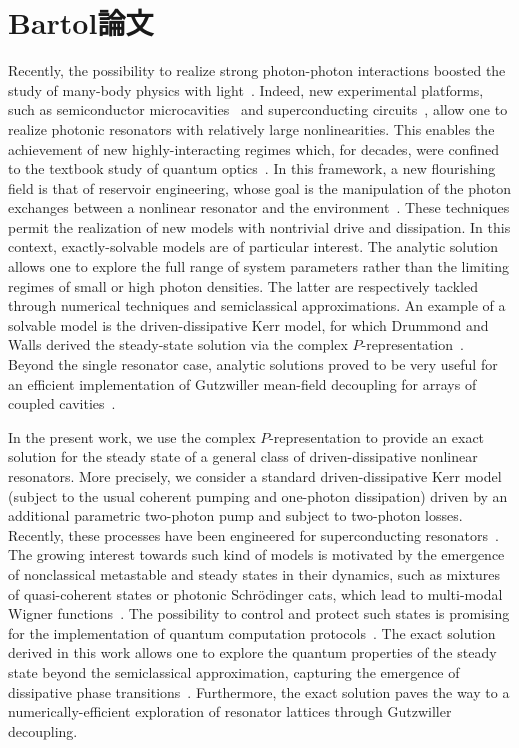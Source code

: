 \section{Bartol論文}
Recently, the possibility to realize strong photon-photon interactions boosted the study of many-body physics with light~\cite{CarusottoRMP13}.
Indeed, new experimental platforms, such as semiconductor microcavities~\cite{WeisbuchPRL92,DeveaudBOOK} and superconducting circuits~\cite{SchoelkopfNature08,YouNature11}, allow one to realize photonic resonators with relatively large nonlinearities.
This enables the achievement of new highly-interacting regimes which, for decades, were confined to the textbook study of quantum optics~\cite{WallsBOOK}.
In this framework, a new flourishing field is that of reservoir engineering, whose goal is the manipulation of the photon exchanges between a nonlinear resonator and the environment~\cite{PoyatosPRL96,VerstraeteNatPhys09,TanPRA13,LinNature13,ArenzJPB13,AsjadJPB14,RoyPRA15,LeghtasScience15}.
These techniques permit the realization of new models with nontrivial drive and dissipation.
In this context, exactly-solvable models are of particular interest.
The analytic solution allows one to explore the full range of system parameters rather than the limiting regimes of small or high photon densities.
The latter are respectively tackled through numerical techniques and semiclassical approximations.
An example of a solvable model is the driven-dissipative Kerr model, for which Drummond and Walls derived the steady-state solution via the complex $P$-representation~\cite{DrummondJPA80a}.
Beyond the single resonator case, analytic solutions proved to be very useful for an efficient implementation of Gutzwiller mean-field decoupling for arrays of coupled cavities~\cite{DiehlPRL10,TomadinPRA11,LeBoitePRL13,LeBoitePRA14,JinPRL13,JinPRA14,WilsonarXiv16}.
	
In the present work, we use the complex $P$-representation to provide an exact solution for the steady state of a general class of driven-dissipative nonlinear resonators.
More precisely, we consider a standard driven-dissipative Kerr model (subject to the usual coherent pumping and one-photon dissipation) driven by an additional parametric two-photon pump and subject to two-photon losses.
Recently, these processes have been engineered for superconducting resonators~\cite{LeghtasScience15}.
The growing interest towards such kind of models is motivated by the emergence of nonclassical metastable and steady states in their dynamics, such as mixtures of quasi-coherent states or photonic Schr\"odinger cats, which lead to multi-modal Wigner functions~\cite{VogelPRA89,KerckhoffOE11,MingantiSciRep16}.
The possibility to control and protect such states is promising for the implementation of quantum computation protocols~\cite{GilchristJOB04,OurjoumtsevScience06,MirrahimiNJP14,GotoPRA16,PuriarXiv16}.
The exact solution derived in this work allows one to explore the quantum properties of the steady state beyond the semiclassical approximation, capturing the emergence of dissipative phase transitions~\cite{CarmichaelPRX15,CasteelsarXiv16}.
Furthermore, the exact solution paves the way to a numerically-efficient exploration of resonator lattices through Gutzwiller decoupling.


